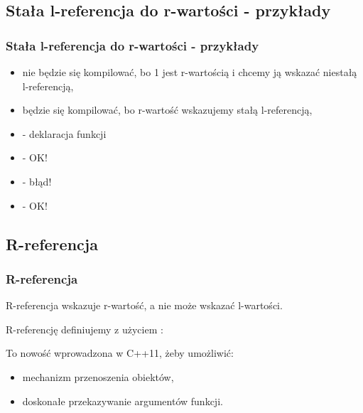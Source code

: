 \documentclass[compress]{beamer}
\begin{document}

\subsection{Stała l-referencja do r-wartości - przykłady}

\begin{frame}

  \frametitle{Stała l-referencja do r-wartości - przykłady}

  \begin{itemize}
  \item {} nie będzie się kompilować, bo 1 jest
    r-wartością i chcemy ją wskazać niestałą l-referencją,
  \item {} będzie się kompilować, bo r-wartość
    wskazujemy stałą l-referencją,
  \item {} - deklaracja funkcji
  \item {} - OK!
  \item {} - błąd!
  \item {} - OK!
  \end{itemize}

\end{frame}


\subsection{R-referencja}

\begin{frame}

  \frametitle{R-referencja}

  R-referencja wskazuje r-wartość, a nie może wskazać l-wartości.

  \vspace{0.5 cm}
  
  R-referencję definiujemy z użyciem \code{&&}: 

  \vspace{0.5 cm}

  To nowość wprowadzona w C++11, żeby umożliwić:

  \begin{itemize}
  \item mechanizm przenoszenia obiektów,
  \item doskonałe przekazywanie argumentów funkcji.
  \end{itemize}

  \vspace{0.5cm}

\end{frame}
\end{document}
